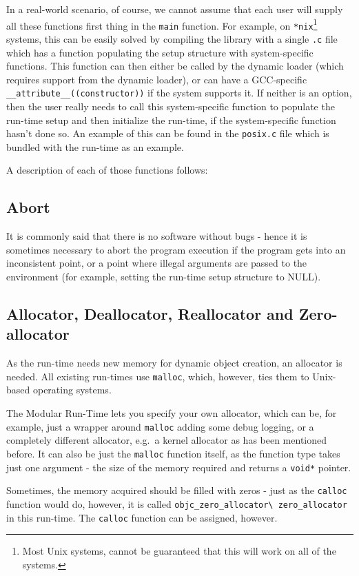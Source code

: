 In a real-world scenario, of course, we cannot assume that each user will supply all these functions first thing in the \verb=main= function. For example, on \verb=*nix=\footnote{Most Unix systems, cannot be guaranteed that this will work on all of the systems.} systems, this can be easily solved by compiling the library with a single \verb=.c= file which has a function populating the setup structure with system-specific functions. This function can then either be called by the dynamic loader (which requires support from the dynamic loader), or can have a GCC-specific \verb=__attribute__((constructor))= if the system supports it. If neither is an option, then the user really needs to call this system-specific function to populate the run-time setup and then initialize the run-time, if the system-specific function hasn't done so. An example of this can be found in the \verb=posix.c= file which is bundled with the run-time as an example.

A description of each of those functions follows:

\subsection{Abort}

It is commonly said that there is no software without bugs - hence it is sometimes necessary to abort the program execution if the program gets into an inconsistent point, or a point where illegal arguments are passed to the environment (for example, setting the run-time setup structure to NULL).

\subsection{Allocator, Deallocator, Reallocator and Zero-allocator}

As the run-time needs new memory for dynamic object creation, an allocator is needed. All existing run-times use \verb=malloc=, which, however, ties them to Unix-based operating systems.

The Modular Run-Time lets you specify your own allocator, which can be, for example, just a wrapper around \verb=malloc= adding some debug logging, or a completely different allocator, e.g.\ a kernel allocator as has been mentioned before. It can also be just the \verb=malloc= function itself, as the function type takes just one argument - the size of the memory required and returns a \verb=void*= pointer.

Sometimes, the memory acquired should be filled with zeros - just as the \verb=calloc= function would do, however, it is called \verb=objc_zero_allocator\ zero_allocator= in this run-time. The \verb=calloc= function can be assigned, however.

